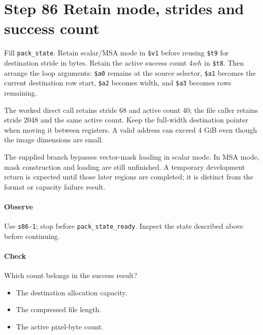 \section{Step 86 Retain mode, strides and success count}
Fill \texttt{pack\_state}. Retain scalar/MSA mode in \texttt{\$v1} before reusing \texttt{\$t9} for destination stride in bytes. Retain the active success count $4wh$ in \texttt{\$t8}. Then arrange the loop arguments: \texttt{\$a0} remains at the source selector, \texttt{\$a1} becomes the current destination row start, \texttt{\$a2} becomes width, and \texttt{\$a3} becomes rows remaining.

The worked direct call retains stride 68 and active count 40; the file caller retains stride 2048 and the same active count. Keep the full-width destination pointer when moving it between registers. A valid address can exceed 4 GiB even though the image dimensions are small.

The supplied branch bypasses vector-mask loading in scalar mode. In MSA mode, mask construction and loading are still unfinished. A temporary development return is expected until those later regions are completed; it is distinct from the format or capacity failure result.

\paragraph{Observe} Use \texttt{s86-1}; stop before \texttt{pack\_state\_ready}. Inspect the state described above before continuing.

\paragraph{Check} Which count belongs in the success result?
\begin{itemize}
  \item[A.] The destination allocation capacity.
  \item[B.] The compressed file length.
  \item[C.] The active pixel-byte count.
\end{itemize}
